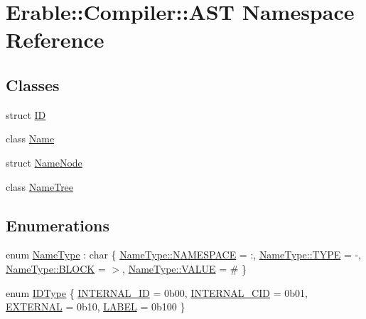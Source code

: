 \hypertarget{namespace_erable_1_1_compiler_1_1_a_s_t}{}\section{Erable\+::Compiler\+::A\+ST Namespace Reference}
\label{namespace_erable_1_1_compiler_1_1_a_s_t}
\subsection*{Classes}
\begin{DoxyCompactItemize}
\item 
struct \mbox{\hyperlink{struct_erable_1_1_compiler_1_1_a_s_t_1_1_i_d}{ID}}
\item 
class \mbox{\hyperlink{class_erable_1_1_compiler_1_1_a_s_t_1_1_name}{Name}}
\item 
struct \mbox{\hyperlink{struct_erable_1_1_compiler_1_1_a_s_t_1_1_name_node}{Name\+Node}}
\item 
class \mbox{\hyperlink{class_erable_1_1_compiler_1_1_a_s_t_1_1_name_tree}{Name\+Tree}}
\end{DoxyCompactItemize}
\subsection*{Enumerations}
\begin{DoxyCompactItemize}
\item 
enum \mbox{\hyperlink{namespace_erable_1_1_compiler_1_1_a_s_t_a9359137137aacfee07e935a0ae706a84}{Name\+Type}} \+: char \{ \mbox{\hyperlink{namespace_erable_1_1_compiler_1_1_a_s_t_a9359137137aacfee07e935a0ae706a84a7347fe5a0f184f79ef064e92e3beb297}{Name\+Type\+::\+N\+A\+M\+E\+S\+P\+A\+CE}} = \textquotesingle{}\+:\textquotesingle{}, 
\mbox{\hyperlink{namespace_erable_1_1_compiler_1_1_a_s_t_a9359137137aacfee07e935a0ae706a84a948495146facadfe8859789036313d79}{Name\+Type\+::\+T\+Y\+PE}} = \textquotesingle{}-\/\textquotesingle{}, 
\mbox{\hyperlink{namespace_erable_1_1_compiler_1_1_a_s_t_a9359137137aacfee07e935a0ae706a84a4d34f53389ed7f28ca91fc31ea360a66}{Name\+Type\+::\+B\+L\+O\+CK}} = \textquotesingle{}$>$\textquotesingle{}, 
\mbox{\hyperlink{namespace_erable_1_1_compiler_1_1_a_s_t_a9359137137aacfee07e935a0ae706a84aecc2e9c313faddb07e7da223c1dc5c3f}{Name\+Type\+::\+V\+A\+L\+UE}} = \textquotesingle{}\#\textquotesingle{}
 \}
\item 
enum \mbox{\hyperlink{namespace_erable_1_1_compiler_1_1_a_s_t_aefbd8bfc43f2ca072b77b8774ac8e5cf}{I\+D\+Type}} \{ \mbox{\hyperlink{namespace_erable_1_1_compiler_1_1_a_s_t_aefbd8bfc43f2ca072b77b8774ac8e5cfa98409ce1c312e2a81588b5c3284a4bc6}{I\+N\+T\+E\+R\+N\+A\+L\+\_\+\+ID}} = 0b00, 
\mbox{\hyperlink{namespace_erable_1_1_compiler_1_1_a_s_t_aefbd8bfc43f2ca072b77b8774ac8e5cfae4eededd40b1f712a245d31b7505ff5b}{I\+N\+T\+E\+R\+N\+A\+L\+\_\+\+C\+ID}} = 0b01, 
\mbox{\hyperlink{namespace_erable_1_1_compiler_1_1_a_s_t_aefbd8bfc43f2ca072b77b8774ac8e5cfa2cdcb848526b9c951b717eb38d256532}{E\+X\+T\+E\+R\+N\+AL}} = 0b10, 
\mbox{\hyperlink{namespace_erable_1_1_compiler_1_1_a_s_t_aefbd8bfc43f2ca072b77b8774ac8e5cfa914df7a679d5aa0669ec255c8d40c0d8}{L\+A\+B\+EL}} = 0b100
 \}
\end{DoxyCompactItemize}
